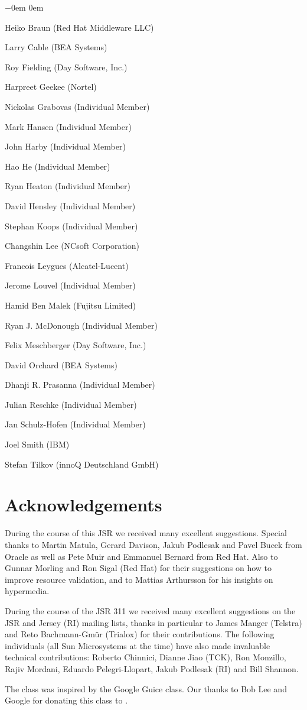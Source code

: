 \begin{list}{$-$}{\parsep 0em  0em}
\item Heiko Braun (Red Hat Middleware LLC) 
\item Larry Cable (BEA Systems)
\item Roy Fielding (Day Software, Inc.)
\item Harpreet Geekee (Nortel)
\item Nickolas Grabovas (Individual Member)
\item Mark Hansen (Individual Member)
\item John Harby (Individual Member)
\item Hao He (Individual Member)
\item Ryan Heaton (Individual Member)
\item David Hensley (Individual Member) 
\item Stephan Koops (Individual Member)
\item Changshin Lee (NCsoft Corporation) 
\item Francois Leygues (Alcatel-Lucent) 
\item Jerome Louvel (Individual Member) 
\item Hamid Ben Malek (Fujitsu Limited) 
\item Ryan J. McDonough (Individual Member) 
\item Felix Meschberger (Day Software, Inc.) 
\item David Orchard (BEA Systems) 
\item Dhanji R. Prasanna (Individual Member) 
\item Julian Reschke (Individual Member) 
\item Jan Schulz-Hofen (Individual Member) 
\item Joel Smith (IBM) 
\item Stefan Tilkov (innoQ Deutschland GmbH)
\end{list}

\section{Acknowledgements}
\label{acks}

During the course of this JSR we received many excellent suggestions. Special thanks to Martin Matula, Gerard Davison, Jakub Podlesak and Pavel Bucek from Oracle as well as Pete Muir and Emmanuel Bernard from Red Hat. Also to Gunnar Morling and Ron Sigal (Red Hat) for their suggestions on how to improve resource validation, and to Mattias Arthursson for his insights on hypermedia.

During the course of the JSR 311 we received many excellent suggestions on the JSR and Jersey (RI) mailing lists, thanks in particular to James Manger (Telstra) and Reto Bachmann-Gm\"{u}r (Trialox) for their contributions. The following individuals (all Sun Microsystems at the time) have also made invaluable technical contributions: Roberto Chinnici, Dianne Jiao (TCK), Ron Monzillo, Rajiv Mordani, Eduardo Pelegri-Llopart, Jakub Podlesak (RI) and Bill Shannon. 

The  class was inspired by the Google Guice  class. Our thanks to Bob Lee and Google for donating this class to \jaxrs. 
